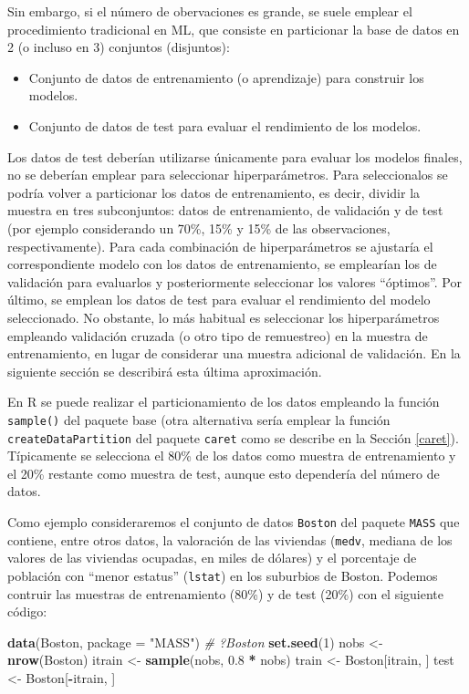 \documentclass[
]{book}
\newenvironment{Shaded}{\begin{snugshade}}{\end{snugshade}}
\newcommand{\CommentTok}[1]{\textcolor[rgb]{0.56,0.35,0.01}{\textit{#1}}}
\newcommand{\DataTypeTok}[1]{\textcolor[rgb]{0.13,0.29,0.53}{#1}}
\newcommand{\DecValTok}[1]{\textcolor[rgb]{0.00,0.00,0.81}{#1}}
\newcommand{\FloatTok}[1]{\textcolor[rgb]{0.00,0.00,0.81}{#1}}
\newcommand{\KeywordTok}[1]{\textcolor[rgb]{0.13,0.29,0.53}{\textbf{#1}}}
\newcommand{\NormalTok}[1]{#1}
\newcommand{\OperatorTok}[1]{\textcolor[rgb]{0.81,0.36,0.00}{\textbf{#1}}}
\newcommand{\StringTok}[1]{\textcolor[rgb]{0.31,0.60,0.02}{#1}}
\theoremstyle{break}
\theoremstyle{definition}
\theoremstyle{definition}
\theoremstyle{definition}
\theoremstyle{remark}
\begin{document}
Sin embargo, si el número de obervaciones es grande, se suele emplear el procedimiento tradicional en ML, que consiste en particionar la base de datos en 2 (o incluso en 3) conjuntos (disjuntos):

\begin{itemize}
\item
  Conjunto de datos de entrenamiento (o aprendizaje) para construir los modelos.
\item
  Conjunto de datos de test para evaluar el rendimiento de los modelos.
\end{itemize}

Los datos de test deberían utilizarse únicamente para evaluar los modelos finales, no se deberían emplear para seleccionar hiperparámetros.
Para seleccionalos se podría volver a particionar los datos de entrenamiento, es decir, dividir la muestra en tres subconjuntos: datos de entrenamiento, de validación y de test (por ejemplo considerando un 70\%, 15\% y 15\% de las observaciones, respectivamente).
Para cada combinación de hiperparámetros se ajustaría el correspondiente modelo con los datos de entrenamiento, se emplearían los de validación para evaluarlos y posteriormente seleccionar los valores ``óptimos''. Por último, se emplean los datos de test para evaluar el rendimiento del modelo seleccionado.
No obstante, lo más habitual es seleccionar los hiperparámetros empleando validación cruzada (o otro tipo de remuestreo) en la muestra de entrenamiento, en lugar de considerar una muestra adicional de validación.
En la siguiente sección se describirá esta última aproximación.

En R se puede realizar el particionamiento de los datos empleando la función \texttt{sample()} del paquete base (otra alternativa sería emplear la función \texttt{createDataPartition} del paquete \texttt{caret} como se describe en la Sección \ref{caret}).
Típicamente se selecciona el 80\% de los datos como muestra de entrenamiento y el 20\% restante como muestra de test, aunque esto dependería del número de datos.

Como ejemplo consideraremos el conjunto de datos \texttt{Boston} del paquete \texttt{MASS} que contiene, entre otros datos, la valoración de las viviendas (\texttt{medv}, mediana de los valores de las viviendas ocupadas, en miles de dólares) y el porcentaje de población con ``menor estatus'' (\texttt{lstat}) en los suburbios de Boston.
Podemos contruir las muestras de entrenamiento (80\%) y de test (20\%) con el siguiente código:

\begin{Shaded}
\begin{Highlighting}[]
\KeywordTok{data}\NormalTok{(Boston, }\DataTypeTok{package =} \StringTok{"MASS"}\NormalTok{)}
\CommentTok{# ?Boston}
\KeywordTok{set.seed}\NormalTok{(}\DecValTok{1}\NormalTok{)}
\NormalTok{nobs <-}\StringTok{ }\KeywordTok{nrow}\NormalTok{(Boston)}
\NormalTok{itrain <-}\StringTok{ }\KeywordTok{sample}\NormalTok{(nobs, }\FloatTok{0.8} \OperatorTok{*}\StringTok{ }\NormalTok{nobs)}
\NormalTok{train <-}\StringTok{ }\NormalTok{Boston[itrain, ]}
\NormalTok{test <-}\StringTok{ }\NormalTok{Boston[}\OperatorTok{-}\NormalTok{itrain, ]}
\end{Highlighting}
\end{Shaded}
\end{document}
